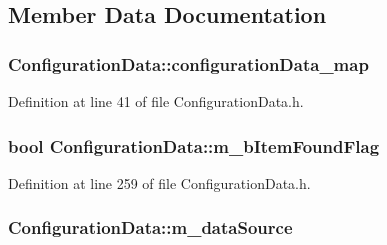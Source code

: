 \subsection{Member Data Documentation}
\subsubsection[{\texorpdfstring{configuration\+Data\+\_\+map}{configurationData_map}}]{ Configuration\+Data\+::configuration\+Data\+\_\+map\hspace{0.3cm}{\ttfamily [static]}}\hypertarget{classConfigurationData_a7068df8bceb0fd7e24abde430532eeca}{}\label{classConfigurationData_a7068df8bceb0fd7e24abde430532eeca}


Definition at line 41 of file Configuration\+Data.\+h.

\subsubsection[{\texorpdfstring{m\+\_\+b\+Item\+Found\+Flag}{m_bItemFoundFlag}}]{\setlength{\rightskip}{0pt plus 5cm}bool Configuration\+Data\+::m\+\_\+b\+Item\+Found\+Flag\hspace{0.3cm}{\ttfamily [protected]}}\hypertarget{classConfigurationData_a358d8d3d441e31872a9f52a5dd0a8943}{}\label{classConfigurationData_a358d8d3d441e31872a9f52a5dd0a8943}


Definition at line 259 of file Configuration\+Data.\+h.

\subsubsection[{\texorpdfstring{m\+\_\+data\+Source}{m_dataSource}}]{ Configuration\+Data\+::m\+\_\+data\+Source\hspace{0.3cm}{\ttfamily [protected]}}\hypertarget{classConfigurationData_a76fde55e5e58cd5726449bee19c378dd}{}\label{classConfigurationData_a76fde55e5e58cd5726449bee19c378dd}


